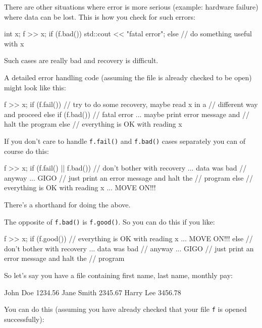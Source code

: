 \begin{consolethree}[escapeinside=||]
There are other situations where error is more serious (example:
hardware failure) where data can be lost. This is how you check for such
errors:

\begin{console}
int x;
f >> x;
if (f.bad())
{  
    std::cout << "fatal error\n";
}
else
{   
    // do something useful with x
}
\end{console}

Such cases are really bad and recovery is difficult.

A detailed error handling code (assuming the file is already checked to be open) might look like this:

\begin{console}
f >> x;
if (f.fail())
{   
    // try to do some recovery, maybe read x in a
    // different way and proceed
}
else if (f.bad())
{   
    // fatal error ... maybe print error message and
    // halt the program
}
else
{   
    // everything is OK with reading x
}
\end{console}

If you don't care to handle \texttt{f.fail()} and
\texttt{f.bad()} cases separately you can of course do this:

\begin{console}
f >> x;
if (f.fail() || f.bad())
{   
    // don't bother with recovery ... data was bad
    // anyway ... GIGO
    // just print an error message and halt the
    // program
}
else
{   
    // everything is OK with reading x ... MOVE ON!!!
}
\end{console}

There's a shorthand for doing the above.

The opposite of \texttt{f.bad()} is \texttt{f.good()}. So you can do this if you like:

\begin{console}
f >> x;
if (f.good())
{    
     // everything is OK with reading x ... MOVE ON!!!
}
else
{   
     // don't bother with recovery ... data was bad
     // anyway ... GIGO
     // just print an error message and halt the
     // program
} 
\end{console}

So let's say you have a file containing first name, last name, monthly pay:

\begin{console}
John Doe 1234.56
Jane Smith 2345.67
Harry Lee 3456.78
\end{console}

You can do this (assuming you have already checked that your file \texttt{f} is opened successfully):


\end{consolethree}
